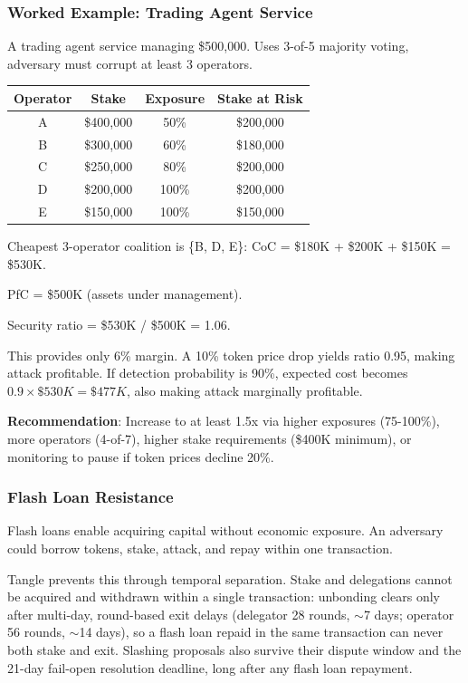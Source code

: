 \documentclass[11pt,a4paper]{article}
\begin{document}
\subsubsection{Worked Example: Trading Agent Service}

A trading agent service managing \$500,000. Uses 3-of-5 majority voting, adversary must corrupt at least 3 operators.

\begin{center}
\begin{tabular}{|c|c|c|c|}
\hline
Operator & Stake & Exposure & Stake at Risk \\
\hline
A & \$400,000 & 50\% & \$200,000 \\
B & \$300,000 & 60\% & \$180,000 \\
C & \$250,000 & 80\% & \$200,000 \\
D & \$200,000 & 100\% & \$200,000 \\
E & \$150,000 & 100\% & \$150,000 \\
\hline
\end{tabular}
\end{center}

Cheapest 3-operator coalition is \{B, D, E\}: CoC = \$180K + \$200K + \$150K = \$530K.

PfC = \$500K (assets under management).

Security ratio = \$530K / \$500K = 1.06.

This provides only 6\% margin. A 10\% token price drop yields ratio 0.95, making attack profitable. If detection probability is 90\%, expected cost becomes $0.9 \times \$530K = \$477K$, also making attack marginally profitable.

\textbf{Recommendation}: Increase to at least 1.5x via higher exposures (75-100\%), more operators (4-of-7), higher stake requirements (\$400K minimum), or monitoring to pause if token prices decline 20\%.

\subsubsection{Flash Loan Resistance}

Flash loans enable acquiring capital without economic exposure. An adversary could borrow tokens, stake, attack, and repay within one transaction.

Tangle prevents this through temporal separation. Stake and delegations cannot be acquired and withdrawn within a single transaction: unbonding clears only after multi-day, round-based exit delays (delegator 28 rounds, $\sim$7 days; operator 56 rounds, $\sim$14 days), so a flash loan repaid in the same transaction can never both stake and exit. Slashing proposals also survive their dispute window and the 21-day fail-open resolution deadline, long after any flash loan repayment.
\end{document}
